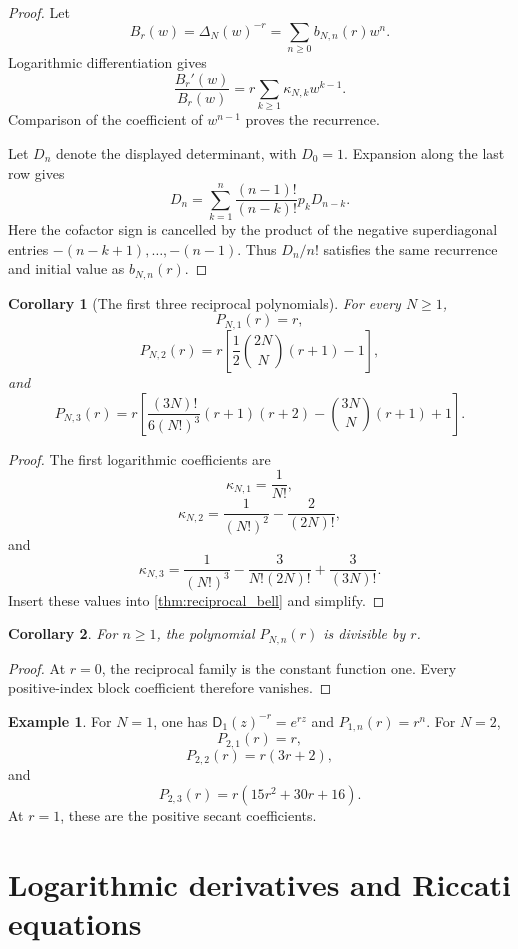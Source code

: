 \documentclass[11pt]{article}
\newtheorem{corollary}[corollary]{Corollary}
\theoremstyle{definition}
\newtheorem{example}[example]{Example}
\theoremstyle{remark}
\newcommand{\Dfun}{\mathsf D}
\begin{document}
\begin{proof}
Let
\[
B_r(w)=\Delta_N(w)^{-r}
=
\sum_{n\geq0}b_{N,n}(r)w^n.
\]
Logarithmic differentiation gives
\[
\frac{B_r'(w)}{B_r(w)}
=
r\sum_{k\geq1}\kappa_{N,k}w^{k-1}.
\]
Comparison of the coefficient of $w^{n-1}$ proves the recurrence.

Let $D_n$ denote the displayed determinant, with $D_0=1$.  Expansion along the last row gives
\[
D_n
=
\sum_{k=1}^{n}
\frac{(n-1)!}{(n-k)!}p_kD_{n-k}.
\]
Here the cofactor sign is cancelled by the product of the negative
superdiagonal entries $-(n-k+1),\ldots,-(n-1)$.
Thus $D_n/n!$ satisfies the same recurrence and initial value as $b_{N,n}(r)$.
\end{proof}

\begin{corollary}[The first three reciprocal polynomials]\label{cor:first_reciprocal_polynomials}
For every $N\geq1$,
\[
P_{N,1}(r)=r,
\]
\[
P_{N,2}(r)
=
r\left[
\frac12\binom{2N}{N}(r+1)-1
\right],
\]
and
\[
P_{N,3}(r)
=
r\left[
\frac{(3N)!}{6(N!)^3}(r+1)(r+2)
-
\binom{3N}{N}(r+1)
+1
\right].
\]
\end{corollary}

\begin{proof}
The first logarithmic coefficients are
\[
\kappa_{N,1}=\frac1{N!},
\]
\[
\kappa_{N,2}=\frac1{(N!)^2}-\frac2{(2N)!},
\]
and
\[
\kappa_{N,3}
=
\frac1{(N!)^3}
-
\frac3{N!(2N)!}
+
\frac3{(3N)!}.
\]
Insert these values into \cref{thm:reciprocal_bell} and simplify.
\end{proof}

\begin{corollary}\label{cor:factor_r}
For $n\geq1$, the polynomial $P_{N,n}(r)$ is divisible by $r$.
\end{corollary}

\begin{proof}
At $r=0$, the reciprocal family is the constant function one.  Every positive-index block coefficient therefore vanishes.
\end{proof}

\begin{example}\label{ex:reciprocal_polynomials}
For $N=1$, one has $\Dfun_1(z)^{-r}=e^{rz}$ and $P_{1,n}(r)=r^n$.  For $N=2$,
\[
P_{2,1}(r)=r,
\]
\[
P_{2,2}(r)=r(3r+2),
\]
and
\[
P_{2,3}(r)=r(15r^2+30r+16).
\]
At $r=1$, these are the positive secant coefficients.
\end{example}

\section{Logarithmic derivatives and Riccati equations}\label{sec:tangent}
\end{document}
